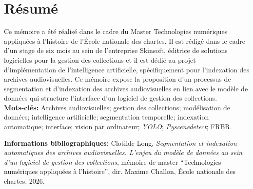 \documentclass[12pt,twoside]{book}
\begin{document}
\frontmatter

	\chapter{Résumé}
\medskip
	Ce mémoire a été réalisé dans le cadre du Master Technologies numériques appliquées à l’histoire de l’École nationale des chartes. Il est rédigé dans le cadre d'un stage de six mois au sein de l'entreprise Skinsoft, éditrice de solutions logicielles pour la gestion des collections et il est dédié au projet d'implémentation de l'intelligence artificielle, spécifiquement pour l'indexation des archives audiovisuelles. Ce mémoire expose la proposition d'un processus de segmentation et d'indexation des archives audiovisuelles en lien avec le modèle de données qui structure l'interface d'un logiciel de gestion des collections.\\
	
	\textbf{Mots-clés:} Archives audiovisuelles; gestion des collections; modélisation de données; intelligence artificielle; segmentation temporelle; indexation automatique; interface; vision par ordinateur; \textit{YOLO}; \textit{Pyscenedetect}; FRBR.
	
	\textbf{Informations bibliographiques:} Clotilde Long, \textit{Segmentation et indexation automatiques des archives audiovisuelles. L'enjeu du modèle de données au sein d'un logiciel de gestion des collections}, mémoire de master \enquote{Technologies numériques appliquées à l'histoire}, dir. Maxime Challon, École nationale des chartes, 2026.
	
	
	
		\newpage{\pagestyle{empty}\cleardoublepage}
	
%	
%	
%	
%	
%	
%	
%	
%	
%	
%	
%	
%	
%	
%	
%	
%	
%	
%	
%	
%	
%	
%	
%	
%	
%	
%	
%	
	
\end{document}
